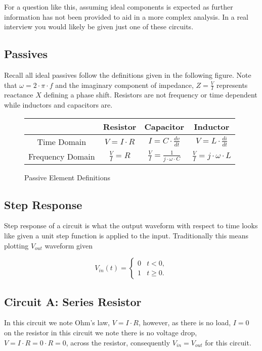 \documentclass[main.tex]{subfiles}
\begin{document}
\spoilerline

\noindent For a question like this, assuming ideal components is expected as further information has not been provided to aid in a more complex analysis. In a real interview you would likely be given just one of these circuits.

\subsection{Passives}
Recall all ideal passives follow the definitions given in the following figure. Note that $\omega = 2 \cdot \pi \cdot f$ and the imaginary component of impedance, $Z = \frac{V}{I}$ represents reactance $X$ defining a phase shift. Resistors are not frequency or time dependent while inductors and capacitors are. 
\begin{figure}[h!]
    \centering
    \begin{tabular}{|c|c|c|c|}
        \hline
         & Resistor & Capacitor & Inductor \\ \hline
        Time Domain & $V = I \cdot R$ & $I = C \cdot \frac{dv}{dt}$ & $V = L \cdot \frac{di}{dt}$ \\ \hline
        Frequency Domain & $\frac{V}{I} = R$ & $\frac{V}{I} = \frac{1}{j \cdot \omega \cdot C}$ & $\frac{V}{I} = j \cdot \omega \cdot L$ \\ \hline
    \end{tabular}
    \caption{Passive Element Definitions}
    \label{fig:passive definitions}
\end{figure}

\subsection{Step Response}
Step response of a circuit is what the output waveform with respect to time looks like given a unit step function is applied to the input. Traditionally this means plotting $V_{out}$ waveform given 

\[
    V_{in}(t) =
    \begin{cases} 
        0 & t < 0, \\
        1 & t \geq 0.
    \end{cases}
\]

\subsection{Circuit A: Series Resistor}
In this circuit we note Ohm's law, $V = I \cdot R$, however, as there is no load, $I=0$ on the resistor in this circuit we note there is no voltage drop, $V=I \cdot R=0 \cdot R=0$, across the resistor, consequently $V_{in} = V_{out}$ for this circuit. 
\end{document}
